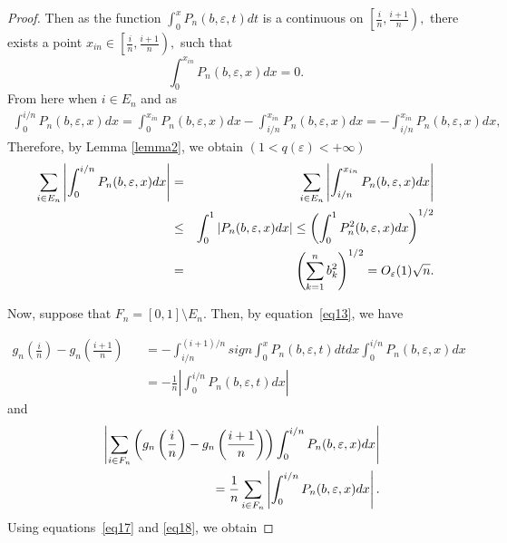 \documentclass[10pt,a4paper]{amsart}
\begin{document}
\begin{proof}
		Then as the function $\int_{0}^{x} P_n(b, \varepsilon, t) dt$  is a continuous on  $\left[\frac{i}{n}, \frac{i+1}{n} \right),$  there exists a point $x_{in}\in \left[\frac{i}{n}, \frac{i+1}{n} \right),$ such that   
		$$\int_{0}^{x_{in}} P_n(b, \varepsilon, x) dx = 0.$$
		From here when $i\in E_n$ and as
		\begin{eqnarray*}
			\int_{0}^{i/n} P_n(b, \varepsilon, x) dx  = \int_{0}^{x_{in}} P_n(b, \varepsilon, x) dx-\int_{i/n}^{x_{in}} P_n(b, \varepsilon, x) dx = -\int_{i/n}^{x_{in}} P_n(b, \varepsilon, x) dx,
		\end{eqnarray*}
		Therefore, by Lemma \ref{lemma2}, we obtain  $(1<q(\varepsilon)<+\infty)$
		\begin{eqnarray}
			\label{eq17}
			\sum_{i\in E_n}\left|\int_{0}^{i/n} P_n(b, \varepsilon, x) dx\right| &=& \sum_{i\in E_n} \left|\int_{i/n}^{x_{in}} P_n(b, \varepsilon, x) dx\right|   \\
			&\leq &\int_{0}^{1} \left|P_n(b, \varepsilon, x) dx\right| \leq \left( \int_{0}^{1}P_n^2(b, \varepsilon, x) dx\right)^{1/2} \notag \\
			&=& \left(\sum_{k=1}^{n}b_k^2\right)^{1/2} =O_\varepsilon(1)\sqrt{n} . \notag
		\end{eqnarray}
		
		Now, suppose that \( F_n = [0,1] \setminus E_n \). Then, by equation~\eqref{eq13}, we have
		
		\begin{eqnarray*}
			g_n \left(\frac{i}{n}\right) -g_n \left(\frac{i+1}{n}\right) 
			&& = - \int_{i/n}^{(i+1)/n} sign \int_{0}^{x} P_n(b, \varepsilon,t) dt dx \int_{0}^{i/n}  P_n(b, \varepsilon,x) dx \\
			&&= - \frac{1}{n} \left|\int_{0}^{i/n}  P_n(b, \varepsilon,t)dx\right|
		\end{eqnarray*}
		and
		\begin{eqnarray}
			\label{eq18} 
			&&\left|\sum_{i\in F_n} \left(g_n \left(\frac{i}{n}\right) -g_n \left(\frac{i+1}{n}\right)\right)\int_{0}^{i/n}  P_n(b, \varepsilon,x)dx\right| \\
			&&= \frac{1}{n} \sum_{i\in F_n} \left| \int_{0}^{i/n} P_n(b, \varepsilon,x)dx\right|.  \notag 
		\end{eqnarray}
		Using equations~\eqref{eq17} and \eqref{eq18}, we obtain
		

\end{proof}
\end{document}
